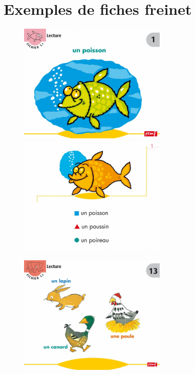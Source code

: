 \appendix
\renewcommand{\thesection}{\Roman{section}}    %
\section{Exemples de fiches freinet}
\label{annexeFreinet}
\begin{center}
\begin{figure}[h]
   \begin{minipage}[c]{.46\linewidth}
      \includegraphics[width=7cm]{img/GSCP_f1recto.jpg}
   \end{minipage}  
   \begin{minipage}[c]{.46\linewidth}
      \includegraphics[width=7cm]{img/GSCP_f1verso.jpg}
   \end{minipage}
\end{figure}
\vline
\vline
\begin{figure}[h]
   \begin{minipage}[c]{.46\linewidth}
      \includegraphics[width=7cm]{img/CP_niv2_f13recto.jpg}

\end{minipage}
\end{figure}
\end{center}

